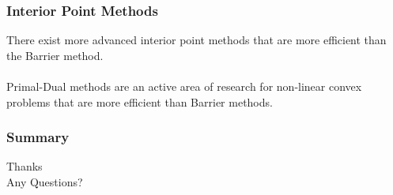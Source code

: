 \documentclass{beamer}
\def\rnum{\mathbb{R}}
\begin{document}
\begin{frame}
    \frametitle{Interior Point Methods}
    There exist more advanced interior point methods that are more efficient
    than the Barrier method.
    \\~\\
    Primal-Dual methods are an active area of research for non-linear convex
    problems that are more efficient than Barrier methods.
\end{frame}

\begin{frame}
    \frametitle{Summary}
\end{frame}

\begin{frame}
    \centering
    Thanks \\
    Any Questions?
\end{frame}

\end{document}

